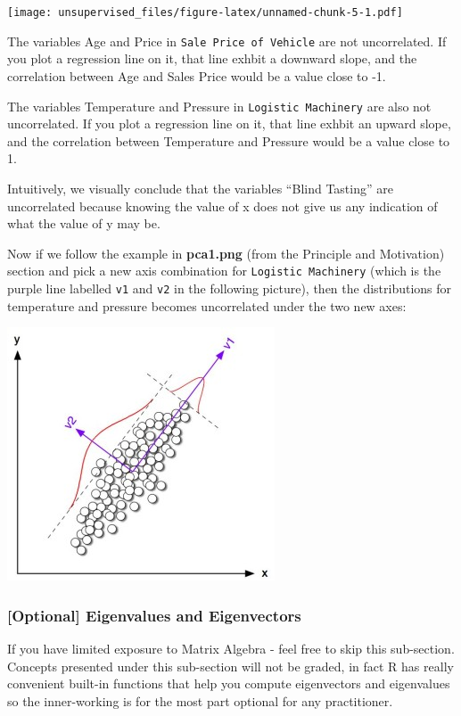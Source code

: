 \documentclass[]{article}
\begin{document}
\texttt{[image: unsupervised\_files/figure-latex/unnamed-chunk-5-1.pdf]}

The variables Age and Price in \texttt{Sale\ Price\ of\ Vehicle} are not
uncorrelated. If you plot a regression line on it, that line exhbit a
downward slope, and the correlation between Age and Sales Price would be
a value close to -1.

The variables Temperature and Pressure in \texttt{Logistic\ Machinery}
are also not uncorrelated. If you plot a regression line on it, that
line exhbit an upward slope, and the correlation between Temperature and
Pressure would be a value close to 1.

Intuitively, we visually conclude that the variables ``Blind Tasting''
are uncorrelated because knowing the value of x does not give us any
indication of what the value of y may be.

Now if we follow the example in \textbf{pca1.png} (from the Principle
and Motivation) section and pick a new axis combination for
\texttt{Logistic\ Machinery} (which is the purple line labelled
\texttt{v1} and \texttt{v2} in the following picture), then the
distributions for temperature and pressure becomes uncorrelated under
the two new axes:

\includegraphics{assets/pca2.jpg}

\hypertarget{optional-eigenvalues-and-eigenvectors}{%
\subsubsection{{[}Optional{]} Eigenvalues and
Eigenvectors}\label{optional-eigenvalues-and-eigenvectors}}

If you have limited exposure to Matrix Algebra - feel free to skip this
sub-section. Concepts presented under this sub-section will not be
graded, in fact R has really convenient built-in functions that help you
compute eigenvectors and eigenvalues so the inner-working is for the
most part optional for any practitioner.
\end{document}
